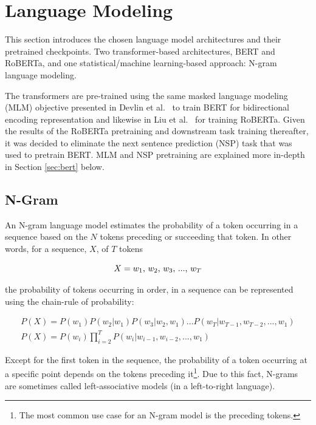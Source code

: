 \documentclass[12pt]{article}
\begin{document}
\section{Language Modeling}\label{sec:language_modeling}
This section introduces the chosen language model architectures and their pretrained checkpoints. Two transformer-based architectures, BERT and RoBERTa, and one statistical/machine learning-based approach: N-gram language modeling.

The transformers are pre-trained using the same masked language modeling (MLM) objective presented in Devlin et al.~\cite{devlin_bert_2019} to train BERT for bidirectional encoding representation and likewise in Liu et al.~\cite{liu_roberta_2019} for training RoBERTa. Given the results of the RoBERTa pretraining and downstream task training thereafter, it was decided to eliminate the next sentence prediction (NSP) task that was used to pretrain BERT. MLM and NSP pretraining are explained more in-depth in Section \ref{sec:bert} below.

\subsection{N-Gram}\label{sec:ngram}
An N-gram language model estimates the probability of a token occurring in a sequence based on the \(N\) tokens preceding or succeeding that token.
In other words, for a sequence, $X$, of $T$ tokens

\begin{equation}\label{eq:ngram_sequence}
    X = \mbox{$w_1$, $w_2$, $w_3$, ..., $w_T$}\\
\end{equation}

\noindent
the probability of tokens occurring in order, in a sequence can be represented using the chain-rule of probability:

\begin{equation}
    \begin{gathered}
        P(X) = P(w_1) P(w_2|w_1) P(w_3|w_2, w_1) ... P(w_T|w_{T-1}, w_{T-2}, ..., w_1)\\
        P(X) = P(w_i)\prod_{i=2}^{T} P(w_i|w_{i-1}, w_{i-2}, ..., w_1)
    \end{gathered}
\end{equation}

\noindent
Except for the first token in the sequence, the probability of a token occurring at a specific point depends on the tokens preceding it\footnote{The most common use case for an N-gram model is the preceding tokens.}. Due to this fact, N-grams are sometimes called left-associative models (in a left-to-right language).
\end{document}
